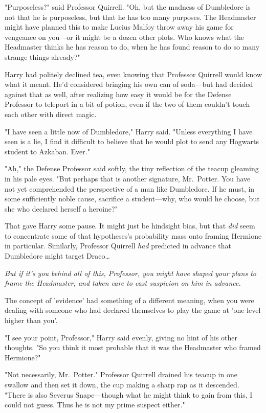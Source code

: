 "Purposeless?" said Professor Quirrell. "Oh, but the madness of Dumbledore is 
not that he is purposeless, but that he has too many purposes. The Headmaster 
might have planned this to make Lucius Malfoy throw away his game for vengeance 
on you---or it might be a dozen other plots. Who knows what the Headmaster 
thinks he has reason to do, when he has found reason to do so many strange 
things already?"

Harry had politely declined tea, even knowing that Professor Quirrell would 
know what it meant. He'd considered bringing his own can of soda---but had 
decided against that as well, after realizing how easy it would be for the 
Defense Professor to teleport in a bit of potion, even if the two of them 
couldn't touch each other with direct magic.

"I have seen a little now of Dumbledore," Harry said. "Unless everything I have 
seen is a lie, I find it difficult to believe that he would plot to send any 
Hogwarts student to Azkaban. Ever."

"Ah," the Defense Professor said softly, the tiny reflection of the teacup 
gleaming in his pale eyes. "But perhaps that is another signature, Mr.~Potter. 
You have not yet comprehended the perspective of a man like Dumbledore. If he 
must, in some sufficiently noble cause, sacrifice a student---why, who would he 
choose, but she who declared herself a heroine?"

That gave Harry some pause. It might just be hindsight bias, but that 
\emph{did} seem to concentrate some of that hypotheses's probability mass onto 
framing Hermione in particular. Similarly, Professor Quirrell \emph{had} 
predicted in advance that Dumbledore might target Draco{\ldots}

\emph{But if it's you behind all of this, Professor, you might have shaped your 
plans to frame the Headmaster, and taken care to cast suspicion on him in 
advance.}

The concept of 'evidence' had something of a different meaning, when you were 
dealing with someone who had declared themselves to play the game at 'one level 
higher than you'.

"I see your point, Professor," Harry said evenly, giving no hint of his other 
thoughts. "So you think it most probable that it was the Headmaster who framed 
Hermione?"

"Not necessarily, Mr.~Potter." Professor Quirrell drained his teacup in one 
swallow and then set it down, the cup making a sharp rap as it descended. 
"There is also Severus Snape---though what he might think to gain from this, I 
could not guess. Thus he is not my prime suspect either."

